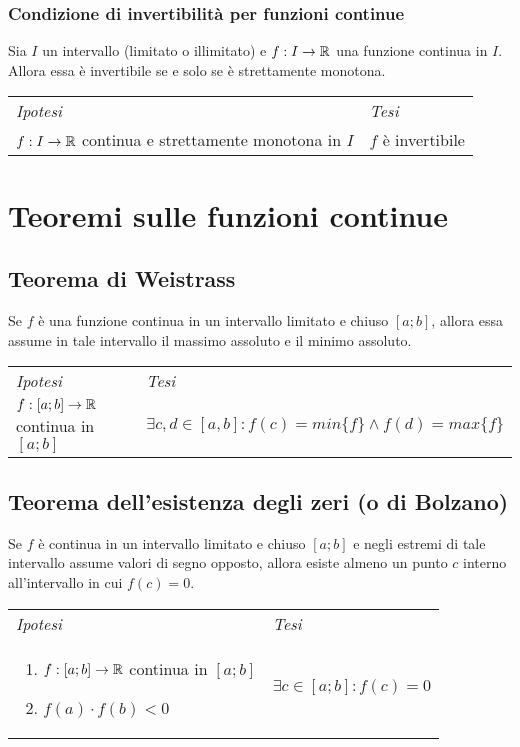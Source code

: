 \documentclass{book}     %
\begin{document}
    \subsubsection{Condizione di invertibilità per funzioni continue}
        \begin{shadedTheorem}
            Sia $I$ un intervallo (limitato o illimitato) e $f:I\rightarrow \mathbb{R}$ una funzione continua in $I$. Allora essa è invertibile se e solo se è strettamente monotona.
        \end{shadedTheorem}
        \begin{tabular}{m{}m{}}
            \textit{Ipotesi} & \textit{Tesi}  \\
            $f:I\to \mathbb{R}$ continua e strettamente monotona in $I$ & $f$ è invertibile 
        \end{tabular}
    
\section{Teoremi sulle funzioni continue}
    \subsection{Teorema di Weistrass}
        \begin{shadedTheorem}[Weistrass]
            Se $f$ è una funzione continua in un intervallo limitato e chiuso $[a;b]$, allora essa assume in tale intervallo il massimo assoluto e il minimo assoluto.
        \end{shadedTheorem}
        \begin{tabular}{m{}m{}}
            \textit{Ipotesi} & \textit{Tesi}  \\
            $f:[a;b]\to \mathbb{R}$ continua in $[a;b]$ & $\exists c,d \in [a,b] : f(c) = min\{f\} \land f(d) = max\{f\}$
        \end{tabular}
    
    \subsection{Teorema dell'esistenza degli zeri (o di Bolzano)}
        \begin{shadedTheorem}[Bolzano]
            Se $f$ è continua in un intervallo limitato e chiuso $[a;b]$ e negli estremi di tale intervallo assume valori di segno opposto, allora esiste almeno un punto $c$ interno all'intervallo in cui $f(c)=0$.
        \end{shadedTheorem}
        \begin{tabular}{m{}m{}}
            \textit{Ipotesi} & \textit{Tesi}  \\
            \begin{enumerate}
                \item $f: [a;b] \to \mathbb{R}$ continua in $[a;b]$
                \item $f(a) \cdot f(b)<0$
            \end{enumerate} & $\exists c \in [a;b]:f(c)=0$ 
        \end{tabular}
    
\end{document}
